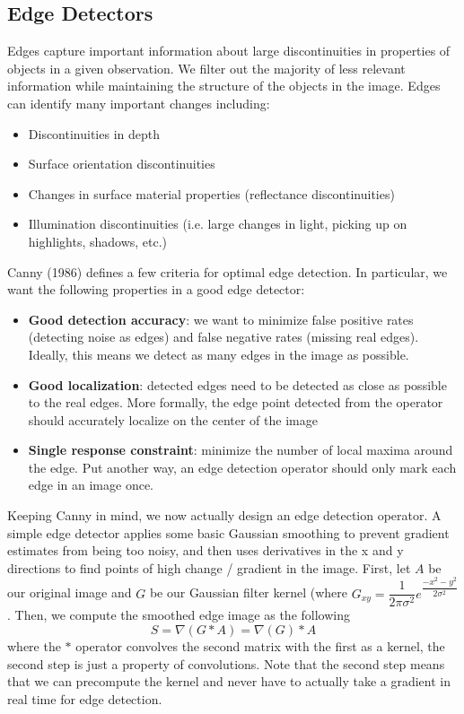 \documentclass[a4paper, 12pt]{article}
\numberwithin{equation}{section}
\begin{document}
\subsection{Edge Detectors}
Edges capture important information about large discontinuities in properties of objects in a given observation. We filter out the majority of less relevant information while maintaining the structure of the objects in the image. Edges can identify many important changes including: 
\begin{itemize}
\item Discontinuities in depth 
\item Surface orientation discontinuities
\item Changes in surface material properties (reflectance discontinuities)
\item Illumination discontinuities (i.e. large changes in light, picking up on highlights, shadows, etc.)
\end{itemize}
Canny (1986) defines a few criteria for optimal edge detection. In particular, we want the following properties in a good edge detector:
\begin{itemize}
\item \textbf{Good detection accuracy}: we want to minimize false positive rates (detecting noise as edges) and false negative rates (missing real edges). Ideally, this means we detect as many edges in the image as possible.
\item \textbf{Good localization}: detected edges need to be detected as close as possible to the real edges. More formally, the edge point detected from the operator should accurately localize on the center of the image
\item \textbf{Single response constraint}: minimize the number of local maxima around the edge. Put another way, an edge detection operator should only mark each edge in an image once.
\end{itemize}
Keeping Canny in mind, we now actually design an edge detection operator. A simple edge detector applies some basic Gaussian smoothing to prevent gradient estimates from being too noisy, and then uses derivatives in the x and y directions to find points of high change / gradient in the image. First, let $A$ be our original image and $G$ be our Gaussian filter kernel (where $G_{xy} = \dfrac{1}{2\pi\sigma^2}e^{\dfrac{-x^2-y^2}{2\sigma^2}}$. Then, we compute the smoothed edge image as the following
$$S = \nabla (G * A) = \nabla (G) * A $$
where the $*$ operator convolves the second matrix with the first as a kernel, the second step is just a property of convolutions. Note that the second step means that we can precompute the kernel and never have to actually take a gradient in real time for edge detection.
\end{document}
